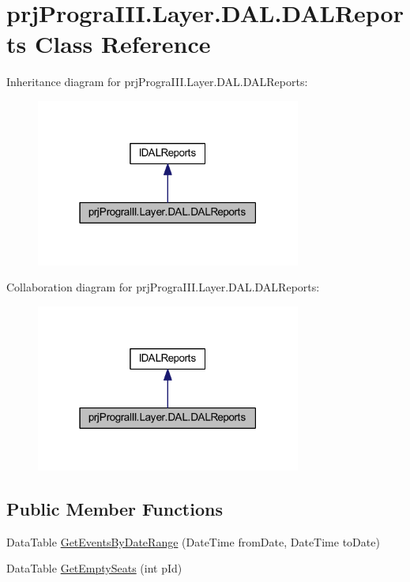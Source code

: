 \hypertarget{classprj_progra_i_i_i_1_1_layer_1_1_d_a_l_1_1_d_a_l_reports}{}\section{prj\+Progra\+I\+I\+I.\+Layer.\+D\+A\+L.\+D\+A\+L\+Reports Class Reference}
\label{classprj_progra_i_i_i_1_1_layer_1_1_d_a_l_1_1_d_a_l_reports}


Inheritance diagram for prj\+Progra\+I\+I\+I.\+Layer.\+D\+A\+L.\+D\+A\+L\+Reports\+:
\nopagebreak
\begin{figure}[H]
\begin{center}
\leavevmode
\includegraphics[width=247pt]{classprj_progra_i_i_i_1_1_layer_1_1_d_a_l_1_1_d_a_l_reports__inherit__graph}
\end{center}
\end{figure}


Collaboration diagram for prj\+Progra\+I\+I\+I.\+Layer.\+D\+A\+L.\+D\+A\+L\+Reports\+:
\nopagebreak
\begin{figure}[H]
\begin{center}
\leavevmode
\includegraphics[width=247pt]{classprj_progra_i_i_i_1_1_layer_1_1_d_a_l_1_1_d_a_l_reports__coll__graph}
\end{center}
\end{figure}
\subsection*{Public Member Functions}
\begin{DoxyCompactItemize}
\item 
Data\+Table \hyperlink{classprj_progra_i_i_i_1_1_layer_1_1_d_a_l_1_1_d_a_l_reports_a2046b157360d6d30057943ea83437458}{Get\+Events\+By\+Date\+Range} (Date\+Time from\+Date, Date\+Time to\+Date)
\item 
Data\+Table \hyperlink{classprj_progra_i_i_i_1_1_layer_1_1_d_a_l_1_1_d_a_l_reports_aac3d2267dc8f67b5b83d3df0c6ce1991}{Get\+Empty\+Seats} (int p\+Id)
\end{DoxyCompactItemize}


